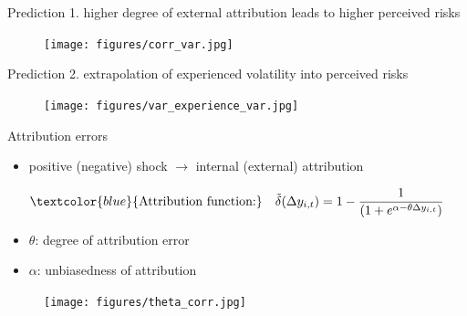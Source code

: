 \documentclass{beamer}
\begin{document}
\begin{frame}{Prediction 1. higher degree of external attribution leads to higher perceived risks}
	\begin{figure}
		\centering 
		\label{var_experience_var}
		\texttt{[image: figures/corr\_var.jpg]}
	\end{figure}
\end{frame}


\begin{frame}{Prediction 2. extrapolation of experienced volatility into perceived risks}
	\begin{figure}
		\centering 
		\label{var_experience_var}
		\texttt{[image: figures/var\_experience\_var.jpg]}
	\end{figure}
\end{frame}

\begin{frame}{Attribution errors}
	\begin{itemize}
		\item positive (negative) shock $\rightarrow$ internal (external) attribution
	\end{itemize}
	\begin{eqnarray}
		\begin{split}
			\textcolor{blue}{\text{Attribution function:}} \quad \tilde \delta(\Delta y_{i,t}) = 1- \frac{1}{(1+e^{\alpha-\theta\Delta y_{i,t}})}
		\end{split}
	\end{eqnarray}
	\begin{itemize}
		\item $\theta$: degree of attribution error
		\item $\alpha$: unbiasedness of attribution
	\end{itemize}
	
\begin{figure}
	\centering 
	\label{var_experience_var}
	\texttt{[image: figures/theta\_corr.jpg]}
\end{figure}
\end{frame}
\end{document}
